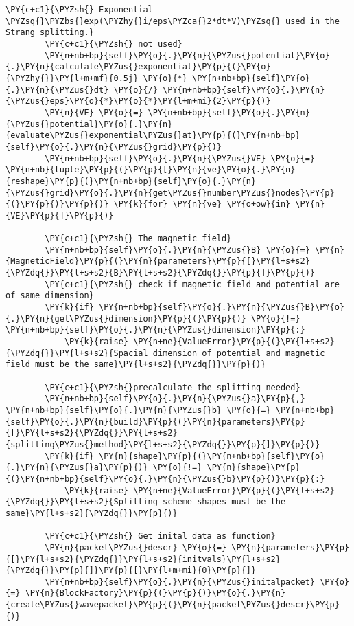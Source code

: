 \begin{Verbatim}[commandchars=\\\{\}]
        \PY{c+c1}{\PYZsh{} Exponential \PYZsq{}\PYZbs{}exp(\PYZhy{}i/eps\PYZca{}2*dt*V)\PYZsq{} used in the Strang splitting.}
        \PY{c+c1}{\PYZsh{} not used}
        \PY{n+nb+bp}{self}\PY{o}{.}\PY{n}{\PYZus{}potential}\PY{o}{.}\PY{n}{calculate\PYZus{}exponential}\PY{p}{(}\PY{o}{\PYZhy{}}\PY{l+m+mf}{0.5j} \PY{o}{*} \PY{n+nb+bp}{self}\PY{o}{.}\PY{n}{\PYZus{}dt} \PY{o}{/} \PY{n+nb+bp}{self}\PY{o}{.}\PY{n}{\PYZus{}eps}\PY{o}{*}\PY{o}{*}\PY{l+m+mi}{2}\PY{p}{)}
        \PY{n}{VE} \PY{o}{=} \PY{n+nb+bp}{self}\PY{o}{.}\PY{n}{\PYZus{}potential}\PY{o}{.}\PY{n}{evaluate\PYZus{}exponential\PYZus{}at}\PY{p}{(}\PY{n+nb+bp}{self}\PY{o}{.}\PY{n}{\PYZus{}grid}\PY{p}{)}
        \PY{n+nb+bp}{self}\PY{o}{.}\PY{n}{\PYZus{}VE} \PY{o}{=} \PY{n+nb}{tuple}\PY{p}{(}\PY{p}{[}\PY{n}{ve}\PY{o}{.}\PY{n}{reshape}\PY{p}{(}\PY{n+nb+bp}{self}\PY{o}{.}\PY{n}{\PYZus{}grid}\PY{o}{.}\PY{n}{get\PYZus{}number\PYZus{}nodes}\PY{p}{(}\PY{p}{)}\PY{p}{)} \PY{k}{for} \PY{n}{ve} \PY{o+ow}{in} \PY{n}{VE}\PY{p}{]}\PY{p}{)}

        \PY{c+c1}{\PYZsh{} The magnetic field}
        \PY{n+nb+bp}{self}\PY{o}{.}\PY{n}{\PYZus{}B} \PY{o}{=} \PY{n}{MagneticField}\PY{p}{(}\PY{n}{parameters}\PY{p}{[}\PY{l+s+s2}{\PYZdq{}}\PY{l+s+s2}{B}\PY{l+s+s2}{\PYZdq{}}\PY{p}{]}\PY{p}{)}
        \PY{c+c1}{\PYZsh{} check if magnetic field and potential are of same dimension}
        \PY{k}{if} \PY{n+nb+bp}{self}\PY{o}{.}\PY{n}{\PYZus{}B}\PY{o}{.}\PY{n}{get\PYZus{}dimension}\PY{p}{(}\PY{p}{)} \PY{o}{!=} \PY{n+nb+bp}{self}\PY{o}{.}\PY{n}{\PYZus{}dimension}\PY{p}{:}
            \PY{k}{raise} \PY{n+ne}{ValueError}\PY{p}{(}\PY{l+s+s2}{\PYZdq{}}\PY{l+s+s2}{Spacial dimension of potential and magnetic field must be the same}\PY{l+s+s2}{\PYZdq{}}\PY{p}{)}

        \PY{c+c1}{\PYZsh{}precalculate the splitting needed}
        \PY{n+nb+bp}{self}\PY{o}{.}\PY{n}{\PYZus{}a}\PY{p}{,} \PY{n+nb+bp}{self}\PY{o}{.}\PY{n}{\PYZus{}b} \PY{o}{=} \PY{n+nb+bp}{self}\PY{o}{.}\PY{n}{build}\PY{p}{(}\PY{n}{parameters}\PY{p}{[}\PY{l+s+s2}{\PYZdq{}}\PY{l+s+s2}{splitting\PYZus{}method}\PY{l+s+s2}{\PYZdq{}}\PY{p}{]}\PY{p}{)}
        \PY{k}{if} \PY{n}{shape}\PY{p}{(}\PY{n+nb+bp}{self}\PY{o}{.}\PY{n}{\PYZus{}a}\PY{p}{)} \PY{o}{!=} \PY{n}{shape}\PY{p}{(}\PY{n+nb+bp}{self}\PY{o}{.}\PY{n}{\PYZus{}b}\PY{p}{)}\PY{p}{:}
            \PY{k}{raise} \PY{n+ne}{ValueError}\PY{p}{(}\PY{l+s+s2}{\PYZdq{}}\PY{l+s+s2}{Splitting scheme shapes must be the same}\PY{l+s+s2}{\PYZdq{}}\PY{p}{)}

        \PY{c+c1}{\PYZsh{} Get inital data as function}
        \PY{n}{packet\PYZus{}descr} \PY{o}{=} \PY{n}{parameters}\PY{p}{[}\PY{l+s+s2}{\PYZdq{}}\PY{l+s+s2}{initvals}\PY{l+s+s2}{\PYZdq{}}\PY{p}{]}\PY{p}{[}\PY{l+m+mi}{0}\PY{p}{]}
        \PY{n+nb+bp}{self}\PY{o}{.}\PY{n}{\PYZus{}initalpacket} \PY{o}{=} \PY{n}{BlockFactory}\PY{p}{(}\PY{p}{)}\PY{o}{.}\PY{n}{create\PYZus{}wavepacket}\PY{p}{(}\PY{n}{packet\PYZus{}descr}\PY{p}{)}



\end{Verbatim}
